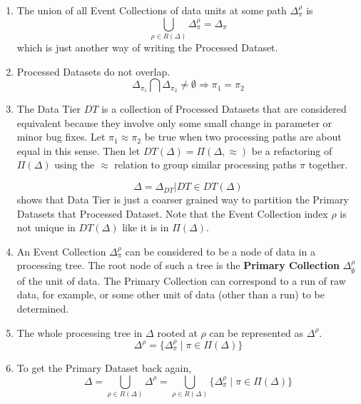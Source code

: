 \documentclass{cmspaper}
\begin{document}
\begin{enumerate}
\item The union of all Event Collections of data units at some path 
      $\Delta_{\pi}^{\rho}$ is 
\begin{equation}
\bigcup_{\rho \in R(\Delta)} \Delta_{\pi}^{\rho} = \Delta_{\pi}
\end{equation}
which is just another way of writing the Processed Dataset.  

\item Processed Datasets do not overlap.  
\begin{equation}
\Delta_{\pi_1} \bigcap \Delta_{\pi_2} \not= \emptyset \Rightarrow \pi_1 = \pi_2
\end{equation}

\item The Data Tier $DT$ is a collection of Processed Datasets that are 
      considered equivalent because they involve only some small change 
      in parameter or minor bug fixes.  Let $\pi_1 \approx \pi_2$ be 
      true when two processing paths are about equal in this sense. 
      Then let $DT(\Delta) = \Pi(\Delta,\approx)$ be a refactoring of 
      $\Pi(\Delta)$ using the $\approx$ relation to group similar 
      processing paths $\pi$ together.  

\begin{equation}
\Delta = {\Delta_{DT} | DT \in DT(\Delta)}
\end{equation}
shows that Data Tier is just a coarser grained way to partition the 
Primary Datasets that Processed Dataset.  Note that the Event Collection 
index $\rho$ is not unique in $DT(\Delta)$ like it is in $\Pi(\Delta)$.

\item An Event Collection $\Delta_{\pi}^{\rho}$ can be considered to be 
      a node of data in a processing tree. The root node of such a tree is 
      the {\bf Primary Collection} $\Delta_{\emptyset}^{\rho}$ of the 
      unit of data.  The Primary Collection can correspond to a run of 
      raw data, for example, or some other unit of data (other than a run) 
      to be determined.  

\item The whole processing tree in $\Delta$ rooted at $\rho$ can be 
      represented as $\Delta^{\rho}$. 
\begin{equation}
\Delta^{\rho} = \{ \Delta_{\pi}^{\rho} \mid \pi \in \Pi(\Delta) \}
\end{equation}

\item To get the Primary Dataset back again, 
\begin{equation}
\Delta = \bigcup_{\rho \in R(\Delta)} \Delta^{\rho} = \bigcup_{\rho \in R(\Delta)} \{ \Delta_{\pi}^{\rho} \mid \pi \in \Pi(\Delta) \} 
\end{equation}

\end{enumerate}
\end{document}
